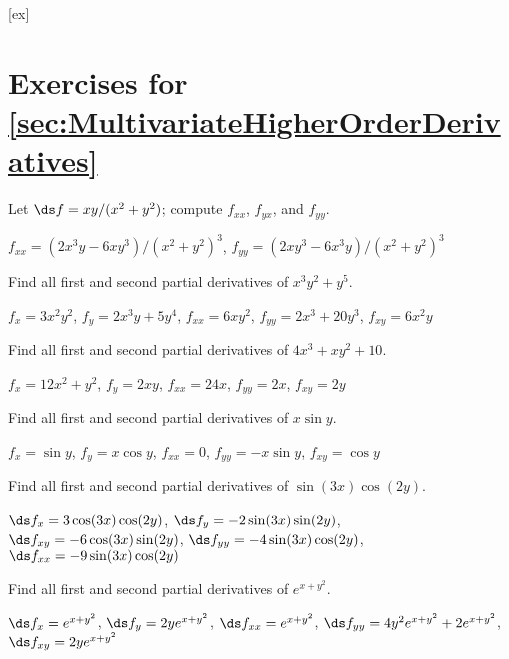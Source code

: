 [ex]
\section*{Exercises for \ref{sec:MultivariateHigherOrderDerivatives}}

\begin{enumialphparenastyle}

\begin{ex}
Let $\ds f=xy/(x^2+y^2)$; compute $f_{xx}$, $f_{yx}$, and $f_{yy}$.
\begin{sol}
$f_{xx}=(2x^3y-6xy^3)/(x^2+y^2)^3$,
$f_{yy}=(2xy^3-6x^3y)/(x^2+y^2)^3$
\end{sol}
\end{ex}

\begin{ex}
Find all first and second partial derivatives of
$x^3y^2+y^5$.
\begin{sol}
$f_x=3x^2y^2$, $f_y=2x^3y+5y^4$, 
$f_{xx}=6xy^2$, $f_{yy}=2x^3+20y^3$, $f_{xy}=6x^2y$
\end{sol}
\end{ex}

\begin{ex}
Find all first and second partial derivatives of
$4x^3+xy^2+10$.
\begin{sol}
$f_x=12x^2+y^2$, $f_y=2xy$, \hfill\break 
$f_{xx}=24x$, $f_{yy}=2x$, $f_{xy}=2y$
\end{sol}
\end{ex}

\begin{ex}
Find all first and second partial derivatives of
$x\sin y$.
\begin{sol}
$f_x=\sin y$, $f_y=x\cos y$, $f_{xx}=0$, $f_{yy}=-x\sin y$,
$f_{xy}=\cos y$
\end{sol}
\end{ex}

\begin{ex}
Find all first and second partial derivatives of
$\sin(3x)\cos(2y)$.
\begin{sol}
$\ds f_x=3\cos(3x)\cos(2y)$,\hfill\break 
$\ds f_y=-2\sin(3x)\sin(2y)$,\hfill\break 
$\ds f_{xy}=-6\cos(3x)\sin(2y)$,\hfill\break 
$\ds f_{yy}=-4\sin(3x)\cos(2y)$,\hfill\break 
$\ds f_{xx}=-9\sin(3x)\cos(2y)$
\end{sol}
\end{ex}

\begin{ex}
Find all first and second partial derivatives of
$e^{x+y^2}$.
\begin{sol}
$\ds f_x=e^{x+y^2}$, $\ds f_y=2ye^{x+y^2}$,\hfill\break 
$\ds f_{xx}=e^{x+y^2}$,\hfill\break 
$\ds f_{yy}=4y^2e^{x+y^2}+2e^{x+y^2}$,\hfill\break 
$\ds f_{xy}=2ye^{x+y^2}$
\end{sol}
\end{ex}


\end{enumialphparenastyle}
